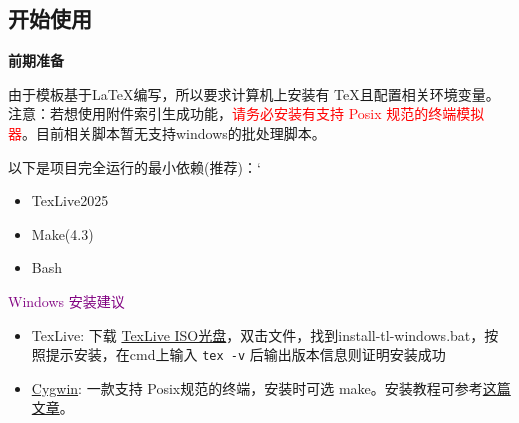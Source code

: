 \documentclass[a4paper,12pt]{ctexart}
\newenvironment{pul}[1]{
	\begin{itemize}[topsep=0pt,labelsep=.5em,leftmargin=\the\dimexpr 0.5em+ #1\relax,itemsep=0em,parsep=.5em]
	}{\end{itemize}}
\begin{document}
	\subsection{开始使用}
	\textbf{前期准备}
	
	\qquad 由于模板基于\LaTeX 编写，所以要求计算机上安装有 TeX且配置相关环境变量。注意：若想使用附件索引生成功能，\textcolor{red}{请务必安装有支持 Posix 规范的终端模拟器}。目前相关脚本暂无支持windows的批处理脚本。
	
	\qquad 以下是项目完全运行的最小依赖(推荐)：`
	\begin{pul}{6em}
		\item TexLive2025
		\item Make(4.3)
		\item Bash
	\end{pul}

	\pagebreak
	
	\qquad \textcolor{purple}{Windows 安装建议}
	\begin{pul}{6em}
		\item
		TexLive: 下载 \href{https://mirrors.tuna.tsinghua.edu.cn/CTAN/systems/texlive/Images/texlive2025-20250308.iso}{TexLive ISO光盘}，双击文件，找到install-tl-windows.bat，按照提示安装，在cmd上输入 \texttt{tex -v} 后输出版本信息则证明安装成功
		\item \href{https://www.cygwin.com/setup-x86_64.exe}{Cygwin}: 一款支持 Posix规范的终端，安装时可选 make。安装教程可参考\href{https://zhuanlan.zhihu.com/p/474242350}{这篇文章}。
	\end{pul}
	
\end{document}
